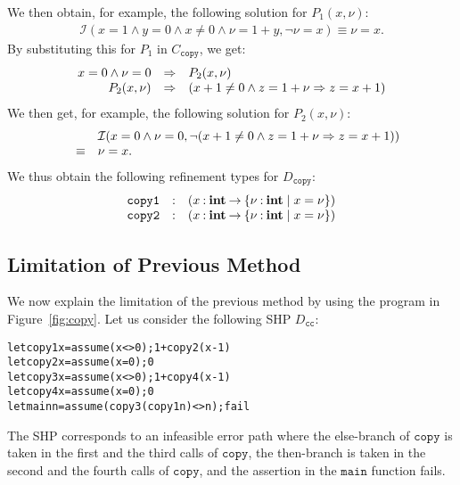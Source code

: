 We then obtain, for example, the following solution for \(P_1(x,\nu)\):
\begin{eqnarray*}
\mathcal{I}(x=1 \land y=0 \land x\neq0 \land \nu=1+y,\neg \nu=x)
\equiv \nu=x.
\end{eqnarray*}
By substituting this for \(P_1\) in \(C_{\texttt{copy}}\), we get:
\[
\begin{array}{rcl}
x=0 \land \nu=0 &\Rightarrow& P_2(x,\nu) \\
P_2(x,\nu) &\Rightarrow& (x+1\neq0 \land z=1+\nu \Rightarrow z=x+1)
\end{array}
\]
We then get, for example, the following solution for \(P_2(x,\nu)\):
\[
\begin{array}{rcl}
&&\mathcal{I}(x=0 \land \nu=0,\neg (x+1\neq0 \land z=1+\nu \Rightarrow z=x+1)) \\
&\equiv& \nu=x.
\end{array}
\]
We thus obtain the following refinement types for \(D_{\texttt{copy}}\):
\[
\begin{array}{rcl}
\texttt{copy1}&\mathbin{:}&(x\mathbin{:}{\mathbf{int}}\mathbin{\rightarrow}{\{{\nu\mathbin{:}\mathbf{int} \mid x=\nu}\}}) \\
\texttt{copy2}&\mathbin{:}&(x\mathbin{:}{\mathbf{int}}\mathbin{\rightarrow}{\{{\nu\mathbin{:}\mathbf{int} \mid x=\nu}\}})
\end{array}
\]

\subsection{Limitation of Previous Method}
\label{sec:limit}

We now explain the limitation of the previous method by using the
program in Figure~\ref{fig:copy}.  Let us consider the following SHP
\(D_{\texttt{cc}}\):
\begin{alltt}
 let copy1 x = assume (x<>0); 1 + copy2 (x-1)
 let copy2 x = assume (x=0); 0
 let copy3 x = assume (x<>0); 1 + copy4 (x-1)
 let copy4 x = assume (x=0); 0
 let main n = assume (copy3 (copy1 n) <> n); fail
\end{alltt}
The SHP corresponds to an infeasible error path where the else-branch of
\(\texttt{copy}\) is taken in the first and the third calls of
\(\texttt{copy}\), the then-branch is taken in the second and the fourth
calls of \(\texttt{copy}\), and the assertion in the \(\texttt{main}\)
function fails.

